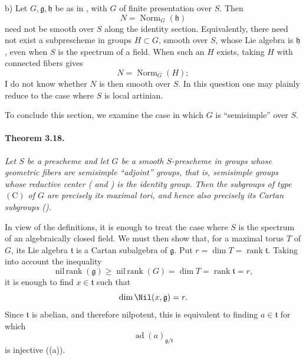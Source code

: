 \smallskip
\noindent
\textup{b)}
Let \(G,\mathfrak g,\mathfrak h\) be as in , with \(G\) of
finite presentation over \(S\). Then
\[
  N=\operatorname{Norm}_G(\mathfrak h)
\]
need not be smooth over \(S\) along the identity section.
Equivalently, there need not exist a subprescheme in groups
\(H\subset G\), smooth over \(S\), whose Lie algebra is
\(\mathfrak h\), even when \(S\) is the spectrum of a field. When
such an \(H\) exists, taking \(H\) with connected fibers gives
\[
  N=\operatorname{Norm}_G(H);
\]
I do not know whether \(N\) is then smooth over \(S\). In this
question one may plainly reduce to the case where \(S\) is local
artinian.



To conclude this section, we examine the case in which \(G\) is
``semisimple'' over \(S\).

\paragraph{\textbf{Theorem 3.18.}}
{\itshape Let \(S\) be a prescheme and let \(G\) be a smooth
\(S\)-prescheme in groups whose geometric fibers are semisimple
``adjoint'' groups, that is, semisimple groups whose reductive
center \textup{( and )} is the identity group. Then the
subgroups of type \((\mathrm C)\) of \(G\) are precisely its
maximal tori, and hence also precisely its Cartan subgroups
\textup{()}.}

In view of the definitions, it is enough to treat the case where
\(S\) is the spectrum of an algebraically closed field. We must
then show that, for a maximal torus \(T\) of \(G\), its Lie algebra
\(\mathfrak t\) is a Cartan subalgebra of \(\mathfrak g\). Put
\(r=\dim T=\operatorname{rank}\mathfrak t\). Taking into account
the inequality
\[
  \operatorname{nil\,rank}(\mathfrak g)
  \geq
  \operatorname{nil\,rank}(G)
  =
  \dim T
  =
  \operatorname{rank}\mathfrak t
  =
  r,
\]
it is enough to find \(x\in\mathfrak t\) such that
\[
  \dim\Nil(x,\mathfrak g)=r.
\]
Since \(\mathfrak t\) is abelian, and therefore nilpotent, this is
equivalent to finding \(a\in\mathfrak t\) for which
\[
  \operatorname{ad}(a)_{\mathfrak g/\mathfrak t}
\]
is injective \textup{(\textup{(a)})}.

